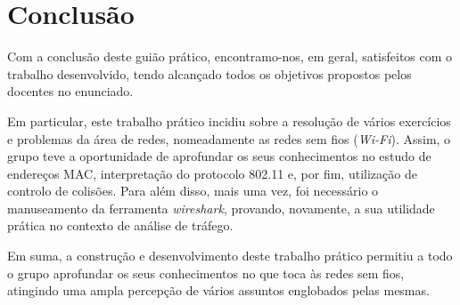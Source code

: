 \documentclass[12pt]{article}
\begin{document}








\section{Conclusão}
    
    \par Com a conclusão deste guião prático, encontramo-nos, em geral, satisfeitos com o trabalho desenvolvido, tendo alcançado todos os objetivos propostos pelos docentes no enunciado.
    
    \par Em particular, este trabalho prático incidiu sobre a resolução de vários exercícios e problemas da área de redes, nomeadamente as redes sem fios (\textit{Wi-Fi}). Assim, o grupo teve a oportunidade de aprofundar os seus conhecimentos no estudo de endereços MAC, interpretação do protocolo 802.11 e, por fim, utilização de controlo de colisões. Para além disso, mais uma vez, foi necessário o manuseamento da ferramenta \textit{wireshark}, provando, novamente, a sua utilidade prática no contexto de análise de tráfego. 

    \par Em suma, a construção e desenvolvimento deste trabalho prático permitiu a todo o grupo aprofundar os seus conhecimentos no que toca às redes sem fios, atingindo uma ampla percepção de vários assuntos englobados pelas mesmas.
\end{document}
